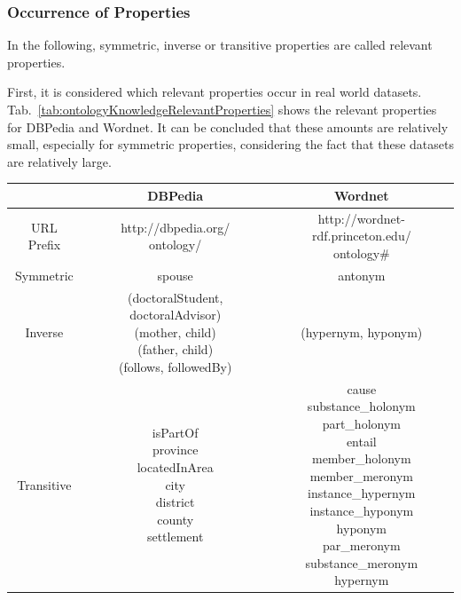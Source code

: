 \subsubsection{Occurrence of Properties}

In the following, symmetric, inverse or transitive properties are called relevant properties.

First, it is considered which relevant properties occur in real world datasets. Tab.~\ref{tab:ontologyKnowledgeRelevantProperties} shows the relevant properties for DBPedia and Wordnet. It can be concluded that these amounts are relatively small, especially for symmetric properties, considering the fact that these datasets are relatively large. 

\begin{center}
	\begin{tabular}{|c|c|c|}
		\hline 
		& DBPedia & Wordnet \\ 
		\hline 
		URL Prefix & \makecell{http://dbpedia.org/\\ontology/} & \makecell{http://wordnet-rdf.princeton.edu/\\ontology\#} \\
		\hline
		Symmetric & spouse & antonym \\ 
		\hline 
		Inverse & \makecell{(doctoralStudent, doctoralAdvisor)\\(mother, child)\\(father, child) \\(follows, followedBy)} & (hypernym, hyponym) \\ 
		\hline 
		Transitive & \makecell{isPartOf\\province\\locatedInArea\\city\\district\\county\\settlement} & \makecell{cause\\substance\_holonym\\part\_holonym\\entail\\member\_holonym\\member\_meronym\\instance\_hypernym\\instance\_hyponym\\hyponym\\par\_meronym\\substance\_meronym\\hypernym} \\ 
		\hline 
	\end{tabular} 
	\label{tab:ontologyKnowledgeRelevantProperties}
\end{center}

